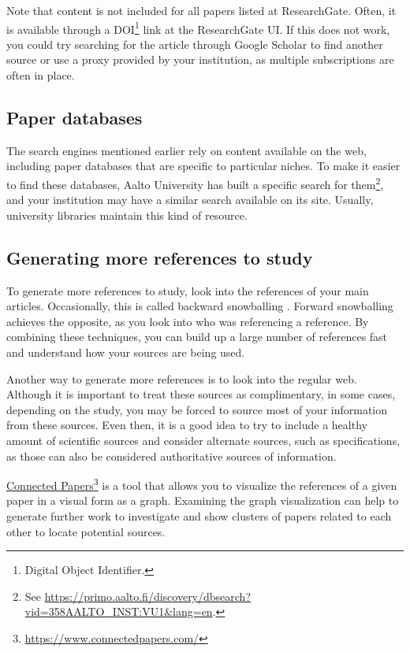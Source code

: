 Note that content is not included for all papers listed at Research\-Gate.
Often, it is available through a DOI\footnote{Digital Object Identifier.} link at the Research\-Gate UI.
If this does not work, you could try searching for the article through Google Scholar to find another source or use a proxy provided by your institution, as multiple subscriptions are often in place.

\subsection{Paper databases}

The search engines mentioned earlier rely on content available on the web, including paper databases that are specific to particular niches.
To make it easier to find these databases, Aalto University has built a specific search for them\footnote{See \url{https://primo.aalto.fi/discovery/dbsearch?vid=358AALTO_INST:VU1&lang=en}.}, and your institution may have a similar search available on its site. Usually, university libraries maintain this kind of resource.

\subsection{Generating more references to study}

To generate more references to study, look into the references of your main articles.
Occasionally, this is called backward snowballing \citep{jalali2012systematic}.
Forward snowballing \citep{jalali2012systematic} achieves the opposite, as you look into who was referencing a reference.
By combining these techniques, you can build up a large number of references fast and understand how your sources are being used.

Another way to generate more references is to look into the regular web.
Although it is important to treat these sources as complimentary, in some cases, depending on the study, you may be forced to source most of your information from these sources.
Even then, it is a good idea to try to include a healthy amount of scientific sources and consider alternate sources, such as specifications, as those can also be considered authoritative sources of information.

\href{https://www.connectedpapers.com/}{Connected Papers}\footnote{\url{https://www.connectedpapers.com/}} is a tool that allows you to visualize the references of a given paper in a visual form as a graph.
Examining the graph visualization can help to generate further work to investigate and show clusters of papers related to each other to locate potential sources.

